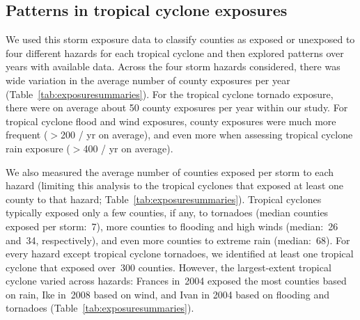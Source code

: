 \subsection*{Patterns in tropical cyclone exposures}

We used this storm exposure data to classify counties as exposed or unexposed
to four different hazards for each tropical cyclone and then explored patterns
over years with available data. Across the four storm hazards considered,
there was wide variation in the average number of county exposures per year
(Table~\ref{tab:exposuresummaries}). For the tropical cyclone tornado exposure,
there were on average about 50 county exposures per year within our study. For
tropical cyclone flood and wind exposures, county exposures were much more
frequent ($>$200 / yr on average), and even more when assessing tropical
cyclone rain exposure ($>$400 / yr on average). 

We also measured the average number of counties exposed per storm to each
hazard (limiting this analysis to the tropical cyclones that exposed at least
one county to that hazard; Table~\ref{tab:exposuresummaries}).  Tropical
cyclones typically exposed only a few counties, if any, to tornadoes (median
counties exposed per storm:~7), more counties to flooding and high winds
(median:~26 and~34, respectively), and even more counties to extreme rain
(median:~68).  For every hazard except tropical cyclone tornadoes, we
identified at least one tropical cyclone that exposed over~300 counties.
However, the largest-extent tropical cyclone varied across hazards: Frances
in~2004 exposed the most counties based on rain, Ike in~2008 based on wind, and
Ivan in 2004 based on flooding and tornadoes
(Table~\ref{tab:exposuresummaries}).

